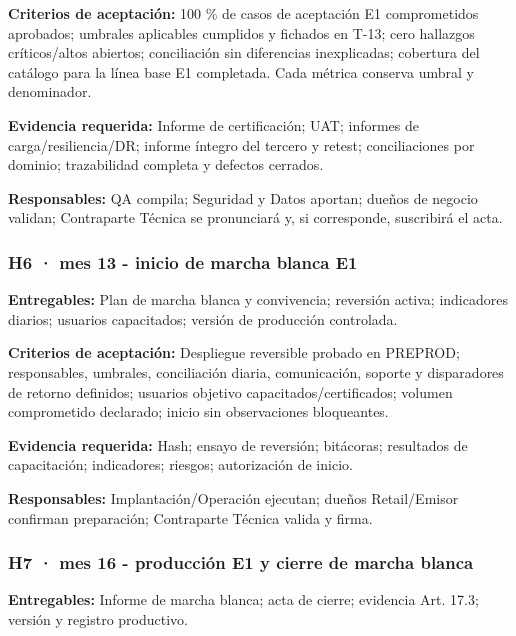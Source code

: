 \documentclass[11pt]{article}
\begin{document}
\textbf{Criterios de aceptación:} 100 \% de casos de aceptación E1 comprometidos aprobados; umbrales aplicables cumplidos y fichados en T-13; cero hallazgos críticos/altos abiertos; conciliación sin diferencias inexplicadas; cobertura del catálogo para la línea base E1 completada. Cada métrica conserva umbral y denominador.

\textbf{Evidencia requerida:} Informe de certificación; UAT; informes de carga/resiliencia/DR; informe íntegro del tercero y retest; conciliaciones por dominio; trazabilidad completa y defectos cerrados.

\textbf{Responsables:} QA compila; Seguridad y Datos aportan; dueños de negocio validan; Contraparte Técnica se pronunciará y, si corresponde, suscribirá el acta.

\subsubsection{\texorpdfstring{\textbf{H6 · mes 13} - inicio de marcha blanca E1}{H6 · mes 13 - inicio de marcha blanca E1}}\label{t17-h6-mes-13-inicio-de-marcha-blanca-e1}

\textbf{Entregables:} Plan de marcha blanca y convivencia; reversión activa; indicadores diarios; usuarios capacitados; versión de producción controlada.

\textbf{Criterios de aceptación:} Despliegue reversible probado en PREPROD; responsables, umbrales, conciliación diaria, comunicación, soporte y disparadores de retorno definidos; usuarios objetivo capacitados/certificados; volumen comprometido declarado; inicio sin observaciones bloqueantes.

\textbf{Evidencia requerida:} Hash; ensayo de reversión; bitácoras; resultados de capacitación; indicadores; riesgos; autorización de inicio.

\textbf{Responsables:} Implantación/Operación ejecutan; dueños Retail/Emisor confirman preparación; Contraparte Técnica valida y firma.

\subsubsection{\texorpdfstring{\textbf{H7 · mes 16} - producción E1 y cierre de marcha blanca}{H7 · mes 16 - producción E1 y cierre de marcha blanca}}\label{t17-h7-mes-16-producciuxf3n-e1-y-cierre-de-marcha-blanca}

\textbf{Entregables:} Informe de marcha blanca; acta de cierre; evidencia Art. 17.3; versión y registro productivo.
\end{document}
